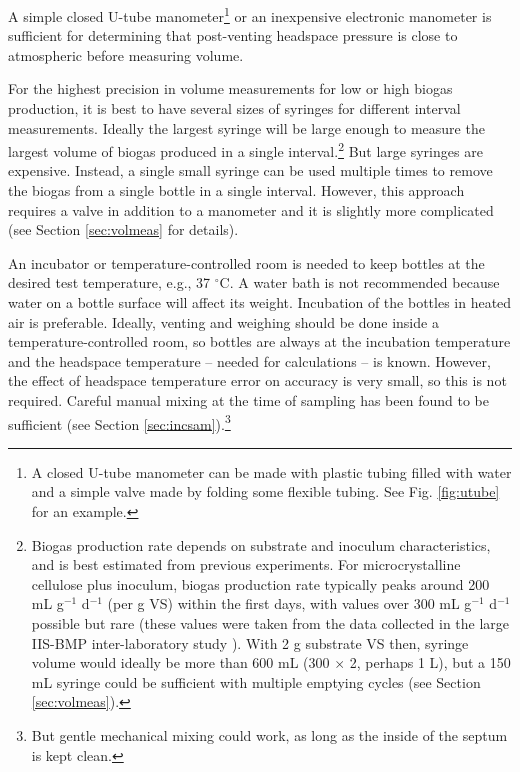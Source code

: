 \documentclass[]{article}
\begin{document}
A simple closed U-tube manometer\footnote{
  A closed U-tube manometer can be made with plastic tubing filled with water and a simple valve made by folding some flexible tubing. See Fig. \ref{fig:utube} for an example.  
} or an inexpensive electronic manometer is sufficient for determining that post-venting headspace pressure is close to atmospheric before measuring volume.

For the highest precision in volume measurements for low or high biogas production, it is best to have several sizes of syringes for different interval measurements.
Ideally the largest syringe will be large enough to measure the largest volume of biogas produced in a single interval.\footnote{
\label{fn:cellrate}
  Biogas production rate depends on substrate and inoculum characteristics, and is best estimated from previous experiments.
  For microcrystalline cellulose plus inoculum, biogas production rate typically peaks around 200 mL g$^{-1}$ d$^{-1}$ (per g VS) within the first days, with values over 300 mL g$^{-1}$ d$^{-1}$ possible but rare (these values were taken from the data collected in the large IIS-BMP inter-laboratory study \citep{hafnerImprovingInterlaboratoryReproducibility2020}).
  With 2 g substrate VS then, syringe volume would ideally be more than 600 mL (300 $\times$ 2, perhaps 1 L), but a 150 mL syringe could be sufficient with multiple emptying cycles (see Section \ref{sec:volmeas}).
}
But large syringes are expensive.
Instead, a single small syringe can be used multiple times to remove the biogas from a single bottle in a single interval.
However, this approach requires a valve in addition to a manometer and it is slightly more complicated (see Section \ref{sec:volmeas} for details).

An incubator or temperature-controlled room is needed to keep bottles at the desired test temperature, e.g., 37 $^\circ$C.
A water bath is not recommended because water on a bottle surface will affect its weight.
Incubation of the bottles in heated air is preferable.
Ideally, venting and weighing should be done inside a temperature-controlled room, so bottles are always at the incubation temperature and the headspace temperature -- needed for calculations -- is known.
However, the effect of headspace temperature error on accuracy is very small, so this is not required.
Careful manual mixing at the time of sampling has been found to be sufficient (see Section \ref{sec:incsam}).\footnote{But gentle mechanical mixing could work, as long as the inside of the septum is kept clean.}
\end{document}
